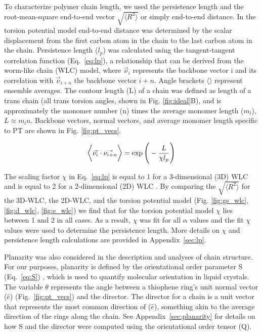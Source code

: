 To characterize polymer chain length, we used the persistence length and the root-mean-square end-to-end vector $\sqrt{\big \langle R^2 \big \rangle}$ or simply end-to-end distance. In the torsion potential model end-to-end distance was determined by the scalar displacement from the first carbon atom in the chain to the last carbon atom in the chain. Persistence length ($l_p$) was calculated using the tangent-tangent correlation function (Eq.~\ref{eq:lp}), a relationship that can be derived from the worm-like chain (WLC) model, where $\vec{\nu}_i$ represents the backbone vector i and its correlation with $\vec{\nu}_{i+n}$ the backbone vector $i+n$. Angle brackets $\big \langle \big \rangle$ represent ensemble averages. The contour length (L) of a chain was defined as length of a trans chain (all trans torsion angles, shown in Fig. \ref{fig:ideal}B), and is approximately the monomer number (n) times the average monomer length ($m_l$), $L \approx m_ln$. Backbone vectors, normal vectors, and average monomer length specific to PT are shown in Fig. \ref{fig:pt_vecs}.

\begin{equation}
\large
\Big \langle \large \Vec{\nu_i} \cdot \Vec{\nu_{i+n}} \Big \rangle = \exp{\bigg(-\frac{L}{\chi l_p}\bigg)}
\label{eq:lp}
\end{equation}

The scaling factor $\chi$ in Eq.~\ref{eq:lp} is equal to 1 for a 3-dimensional (3D) WLC and is equal to 2 for a 2-dimensional (2D) WLC \cite{Meyer2016}. By comparing the $\sqrt{\big \langle R^2 \big \rangle}$ for the 3D-WLC, the 2D-WLC, and the torsion potential model (Fig. \ref{fig:gs_wlc}, \ref{fig:d_wlc}, \ref{fig:e_wlc}) we find that for the torsion potential model $\chi$ lies between 1 and 2 in all cases. As a result, $\chi$ was fit for all $\alpha$ values and the fit $\chi$ values were used to determine the persistence length. More details on $\chi$ and persistence length calculations are provided in Appendix~\ref{sec:lp}.

Planarity was also considered in the description and analyses of chain structure. For our purposes, planarity is defined by the orientational order parameter S (Eq.~\ref{eq:S}) \cite{Allen2017}, which is used to quantify molecular orientation in liquid crystals. The variable $\theta$ represents the angle between a thiophene ring's unit normal vector ($\hat{e}$) (Fig.~\ref{fig:pt_vecs}) and the director. The director for a chain is a unit vector that represents the most common direction of ($\hat{e}$), something akin to the average direction of the rings along the chain. See Appendix~\ref{sec:planarity} for details on how S and the director were computed using the orientational order tensor (Q).

